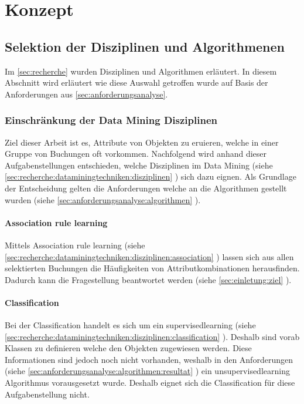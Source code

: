\chapter{Konzept}
\label{sec:konzept}

\section{Selektion der Disziplinen und Algorithmenen}
\label{sec:konzept:disziplin-und-algorithmen}
Im \cref{sec:recherche} wurden Disziplinen und Algorithmen erläutert. In diesem Abschnitt wird erläutert wie diese Auswahl getroffen wurde auf Basis der Anforderungen aus \cref{sec:anforderungsanalyse}.

\subsection{Einschränkung der Data Mining Disziplinen}
\label{sec:konzept:disziplinauswahl}
Ziel dieser Arbeit ist es, Attribute von Objekten zu eruieren, welche in einer Gruppe von Buchungen oft vorkommen. Nachfolgend wird anhand dieser Aufgabenstellungen entschieden, welche Disziplinen im Data Mining (siehe \cref{sec:recherche:dataminingtechniken:disziplinen} ) sich dazu eignen. Als Grundlage der Entscheidung gelten die Anforderungen welche an die Algorithmen gestellt wurden (siehe \cref{sec:anforderungsanalyse:algorithmen} ).

\subsubsection{Association rule learning}
\label{sec:konzept:disziplinauswahl:association}
Mittels Association rule learning (siehe \cref{sec:recherche:dataminingtechniken:disziplinen:association} ) lassen sich aus allen selektierten Buchungen die Häufigkeiten von Attributkombinationen herausfinden. Dadurch kann die Fragestellung beantwortet werden (siehe \cref{sec:einletung:ziel} ).


\subsubsection{Classification}
\label{sec:konzept:disziplinauswahl:classification}
Bei der Classification handelt es sich um ein \gls{supervisedlearning} (siehe \cref{sec:recherche:dataminingtechniken:disziplinen:classification} ). Deshalb sind vorab Klassen zu definieren welche den Objekten zugewiesen werden. Diese Informationen sind jedoch noch nicht vorhanden, weshalb in den Anforderungen (siehe \cref{sec:anforderungsanalyse:algorithmen:resultat} ) ein \gls{unsupervisedlearning} Algorithmus vorausgesetzt wurde. Deshalb eignet sich die Classification für diese Aufgabenstellung nicht.

